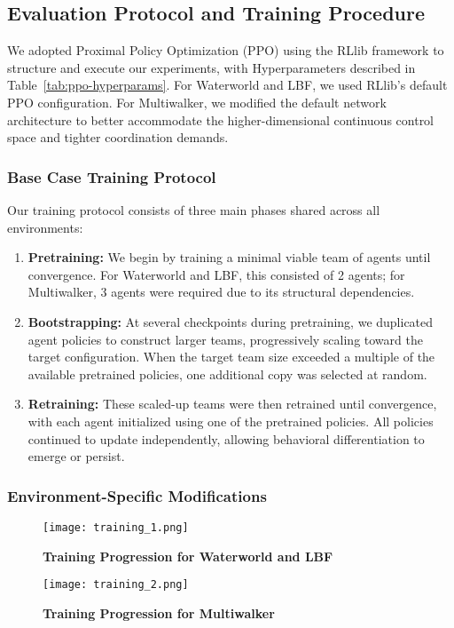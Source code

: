 \documentclass{article}
\begin{document}
\subsection{Evaluation Protocol and Training Procedure}

We adopted Proximal Policy Optimization (PPO)\cite{schulman2017} using the RLlib 
framework to structure and execute our experiments, with Hyperparameters described in
Table~\ref{tab:ppo-hyperparams}. For Waterworld and LBF, 
we used RLlib's default PPO configuration. For Multiwalker, we modified the default 
network architecture to better accommodate the higher-dimensional continuous control space and 
tighter coordination demands.

\subsubsection{Base Case Training Protocol}

Our training protocol consists of three main phases shared across all environments:
\begin{enumerate}
    \item \textbf{Pretraining:} We begin by training a minimal viable team of agents until convergence. For Waterworld and LBF, this consisted of 2 agents; for Multiwalker, 3 agents were required due to its structural dependencies.
    \item \textbf{Bootstrapping:} At several checkpoints during pretraining, we duplicated agent policies to construct larger teams, progressively scaling toward the target configuration. When the target team size exceeded a multiple of the available pretrained policies, one additional copy was selected at random.
    \item \textbf{Retraining:} These scaled-up teams were then retrained until convergence, 
    with each agent initialized using one of the pretrained policies. 
    All policies continued to update independently, allowing behavioral differentiation to emerge or persist.
\end{enumerate}

\subsubsection{Environment-Specific Modifications}

\begin{figure}[!h]
    \centering
    \texttt{[image: training\_1.png]}
    \caption{\textbf{Training Progression for Waterworld and LBF} }
    \label{fig:training_1}
\end{figure}
\begin{figure}[!h]
    \centering
    \texttt{[image: training\_2.png]}
    \caption{\textbf{Training Progression for Multiwalker} }
    \label{fig:training_2}
\end{figure}
\end{document}
